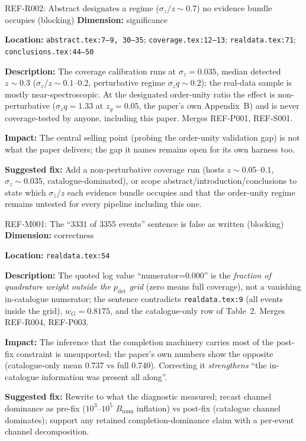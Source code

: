 \documentclass[11pt]{article}
\begin{document}
\begin{MajorIssueBox}{REF-R002: Abstract designates a regime ($\sigma_z/z \sim 0.7$) no evidence bundle occupies (blocking)}
\textbf{Dimension:} significance

\textbf{Location:} \texttt{abstract.tex:7--9, 30--35}; \texttt{coverage.tex:12--13}; \texttt{realdata.tex:71}; \texttt{conclusions.tex:44--50}

\textbf{Description:} The coverage calibration runs at $\sigma_z = 0.035$, median detected $z \sim 0.3$ ($\sigma_z/z \sim 0.1$--$0.2$, perturbative regime $\sigma_z q \sim 0.2$); the real-data sample is mostly near-spectroscopic. At the designated order-unity ratio the effect is non-perturbative ($\sigma_z q = 1.33$ at $z_g = 0.05$, the paper's own Appendix~B) and is never coverage-tested by anyone, including this paper. Merges REF-P001, REF-S001.

\textbf{Impact:} The central selling point (probing the order-unity validation gap) is not what the paper delivers; the gap it names remains open for its own harness too.

\textbf{Suggested fix:} Add a non-perturbative coverage run (hosts $z \sim 0.05$--$0.1$, $\sigma_z \sim 0.035$, catalogue-dominated), or scope abstract/introduction/conclusions to state which $\sigma_z/z$ each evidence bundle occupies and that the order-unity regime remains untested for every pipeline including this one.
\end{MajorIssueBox}

\begin{MajorIssueBox}{REF-M001: The ``3331 of 3355 events'' sentence is false as written (blocking)}
\textbf{Dimension:} correctness

\textbf{Location:} \texttt{realdata.tex:54}

\textbf{Description:} The quoted log value ``numerator=0.000'' is the \emph{fraction of quadrature weight outside the $p_\mathrm{det}$ grid} (zero means full coverage), not a vanishing in-catalogue numerator; the sentence contradicts \texttt{realdata.tex:9} (all events inside the grid), $w_G = 0.8175$, and the catalogue-only row of Table~2. Merges REF-R004, REF-P003.

\textbf{Impact:} The inference that the completion machinery carries most of the post-fix constraint is unsupported; the paper's own numbers show the opposite (catalogue-only mean 0.737 vs full 0.740). Correcting it \emph{strengthens} ``the in-catalogue information was present all along''.

\textbf{Suggested fix:} Rewrite to what the diagnostic measured; recast channel dominance as pre-fix ($10^3$--$10^5$ $B_\mathrm{num}$ inflation) vs post-fix (catalogue channel dominates); support any retained completion-dominance claim with a per-event channel decomposition.
\end{MajorIssueBox}
\end{document}

